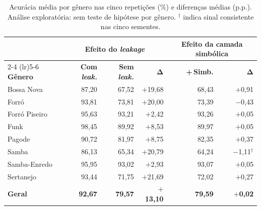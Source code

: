 \begin{table}[t]
\centering
\caption{Acurácia média por gênero nas cinco repetições (\%) e diferenças
médias (p.p.). Análise exploratória: sem teste de hipótese por gênero.
$^{\dagger}$ indica sinal consistente nas cinco sementes.}
\label{tab:genero}
\begin{tabular}{@{}lrrrrr@{}}
\toprule
& \multicolumn{3}{c}{\textbf{Efeito do \textit{leakage}}} & \multicolumn{2}{c}{\textbf{Efeito da camada simbólica}} \\
\cmidrule(lr){2-4} \cmidrule(lr){5-6}
\textbf{Gênero} & \textbf{Com \textit{leak.}} & \textbf{Sem \textit{leak.}} & $\boldsymbol{\Delta}$ &
\textbf{+\,Simb.} & $\boldsymbol{\Delta}$ \\
\midrule
Bossa Nova & 87,20 & 67,52 & $+$19,68 & 68,43 & $+$0,91 \\
Forró & 93,81 & 73,81 & $+$20,00 & 73,39 & $-$0,43 \\
Forró Piseiro & 95,63 & 93,21 & $+$2,42 & 93,26 & $+$0,05 \\
Funk & 98,45 & 89,92 & $+$8,53 & 89,97 & $+$0,05 \\
Pagode & 90,72 & 81,97 & $+$8,75 & 82,35 & $+$0,37 \\
Samba & 86,13 & 65,34 & $+$20,79 & 64,24 & $-$1,11$^{\dagger}$ \\
Samba-Enredo & 95,95 & 93,02 & $+$2,93 & 93,07 & $+$0,05 \\
Sertanejo & 93,44 & 71,75 & $+$21,69 & 72,02 & $+$0,27 \\
\midrule
\textbf{Geral} & \textbf{92,67} & \textbf{79,57} & \textbf{$+$13,10} & \textbf{79,59} & \textbf{$+$0,02} \\
\bottomrule
\end{tabular}
\end{table}
